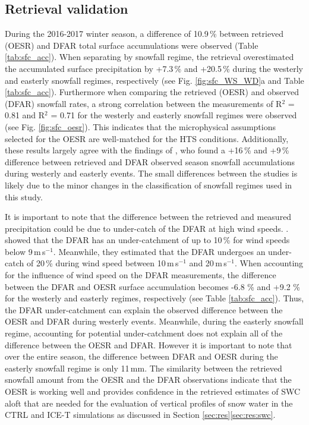 \documentclass{ametsocV5}
\begin{document}
    \subsection{Retrieval validation}
        During the 2016-2017 winter season, a difference of 10.9\,\% between retrieved (OESR) and DFAR total surface accumulations were observed (Table \ref{tab:sfc_acc}). When separating by snowfall regime, the retrieval overestimated the accumulated surface precipitation by +7.3\,\% and +20.5\,\% during the westerly and easterly snowfall regimes, respectively (see Fig. \ref{fig:sfc_WS_WD}a and Table \ref{tab:sfc_acc}). Furthermore when comparing the retrieved (OESR) and observed (DFAR) snowfall rates,  a strong correlation between the measurements of R$^2$ = 0.81 and R$^2$ = 0.71 for the westerly and easterly snowfall regimes were observed (see Fig. \ref{fig:sfc_oesr}). This indicates that the microphysical assumptions selected for the OESR are well-matched for the HTS conditions. Additionally, these results largely agree with the findings of \citet{schirle_estimation_2019}, who found a +16\,\% and +9\,\% difference between retrieved and DFAR observed season snowfall accumulations during westerly and easterly events. The small differences between the studies is likely due to the minor changes in the classification of snowfall regimes used in this study. 
        
        It is important to note that the difference between the retrieved and measured precipitation could be due to under-catch of the DFAR at high wind speeds. \citep{theriault_impact_2015,nitu_iom_2018,colli_adjustments_2020}. \citet{nitu_iom_2018} showed that the DFAR has an under-catchment of up to 10\,\% for wind speeds below 9\,m\,s$^{-1}$. Meanwhile, they estimated that the DFAR undergoes an under-catch of 20\,\% during wind speed between 10\,m\,s$^{-1}$ and 20\,m\,s$^{-1}$. When accounting for the influence of wind speed on the DFAR measurements, the difference between the DFAR and OESR surface accumulation becomes -6.8 \% and +9.2 \% for the westerly and easterly regimes, respectively (see Table \ref{tab:sfc_acc}). Thus, the DFAR under-catchment can explain the observed difference between the OESR and DFAR during westerly events. Meanwhile, during the easterly snowfall regime, accounting for potential under-catchment does not explain all of the difference between the OESR and DFAR. However it is important to note that over the entire season, the difference between DFAR and OESR during the easterly snowfall regime is only 11\,mm. 
        The similarity between the retrieved snowfall amount from the OESR and the DFAR observations indicate that the OESR is working well and provides confidence in the retrieved estimates of SWC aloft that are needed for the evaluation of vertical profiles of snow water in the CTRL and ICE-T simulations as discussed in Section \ref{sec:res}\ref{sec:res:swc}.
    
\end{document}
